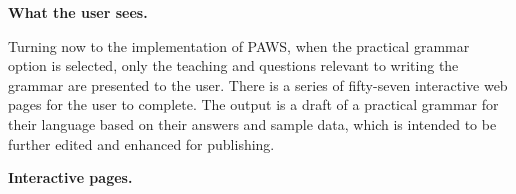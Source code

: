 \documentclass[12pt]{article}
\begin{document}
{{\textbf{{ }}}}{\noindent
\textbf{{\protect\noindent
What the user sees. }}}
Turning now to the implementation of {PAWS}, when the practical grammar option is selected, only the teaching and questions relevant to writing the grammar are presented to the user. There is a series of fifty-seven interactive web pages for the user to complete. The output is a draft of a practical grammar for their language based on their answers and sample data, which is intended to be further edited and enhanced for publishing.\par{}\vspace{.25in}\noindent\protect\hypertarget{sPages}{{\noindent
\textbf{{ }}}}{\noindent
\textbf{{\protect\noindent
Interactive pages. }}}
\end{document}
